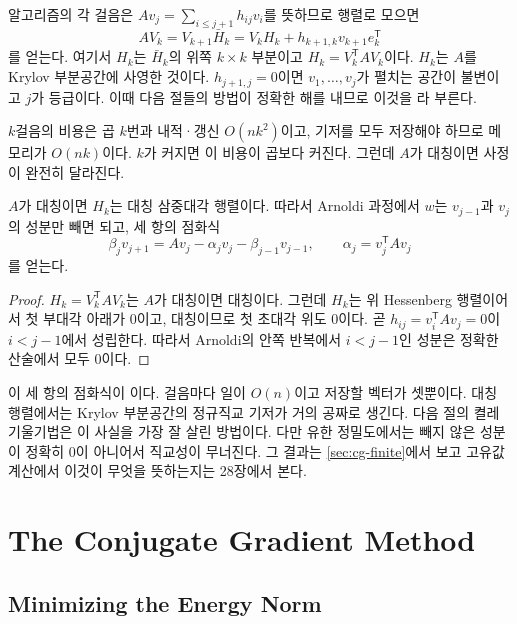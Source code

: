 알고리즘의 각 걸음은 $Av_j=\sum_{i\le j+1}h_{ij}v_i$를 뜻하므로 행렬로 모으면 
\begin{equation}
\label{eq:arnoldi}
AV_k=V_{k+1}\bar H_k=V_kH_k+h_{k+1,k}v_{k+1}e_k^{\mathsf T}
\end{equation}
를 얻는다. 여기서 $H_k$는 $\bar H_k$의 위쪽 $k\times k$ 부분이고 $H_k=V_k^{\mathsf T}AV_k$이다. $H_k$는 $A$를 Krylov 부분공간에 사영한 것이다. $h_{j+1,j}=0$이면 $v_1,\dots,v_j$가 펼치는 공간이 불변이고 $j$가 등급이다. 이때 다음 절들의 방법이 정확한 해를 내므로 이것을 라 부른다.

$k$걸음의 비용은 곱 $k$번과 내적·갱신 $O(nk^2)$이고, 기저를 모두 저장해야 하므로 메모리가 $O(nk)$이다. $k$가 커지면 이 비용이 곱보다 커진다. 그런데 $A$가 대칭이면 사정이 완전히 달라진다.

\begin{proposition}
\label{prop:lanczos-tridiagonal}
$A$가 대칭이면 $H_k$는 대칭 삼중대각 행렬이다. 따라서 Arnoldi 과정에서 $w$는 $v_{j-1}$과 $v_j$의 성분만 빼면 되고, 세 항의 점화식
\[
\beta_{j}v_{j+1}=Av_j-\alpha_jv_j-\beta_{j-1}v_{j-1},\qquad\alpha_j=v_j^{\mathsf T}Av_j
\]
를 얻는다.
\end{proposition}

\begin{proof}
$H_k=V_k^{\mathsf T}AV_k$는 $A$가 대칭이면 대칭이다. 그런데 $H_k$는 위 Hessenberg 행렬이어서 첫 부대각 아래가 $0$이고, 대칭이므로 첫 초대각 위도 $0$이다. 곧 $h_{ij}=v_i^{\mathsf T}Av_j=0$이 $i<j-1$에서 성립한다. 따라서 Arnoldi의 안쪽 반복에서 $i<j-1$인 성분은 정확한 산술에서 모두 $0$이다.
\end{proof}

이 세 항의 점화식이 이다\cite{lanczos1950}. 걸음마다 일이 $O(n)$이고 저장할 벡터가 셋뿐이다. 대칭 행렬에서는 Krylov 부분공간의 정규직교 기저가 거의 공짜로 생긴다. 다음 절의 켤레 기울기법은 이 사실을 가장 잘 살린 방법이다. 다만 유한 정밀도에서는 빼지 않은 성분이 정확히 $0$이 아니어서 직교성이 무너진다. 그 결과는 \cref{sec:cg-finite}에서 보고 고유값 계산에서 이것이 무엇을 뜻하는지는 28장에서 본다.

\section{The Conjugate Gradient Method}
\label{sec:cg}

\subsection{Minimizing the Energy Norm}

